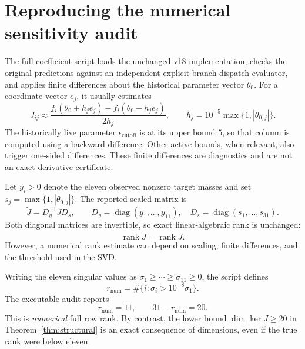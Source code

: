 \documentclass[11pt]{article}
\newcommand{\rank}{\operatorname{rank}}
\newcommand{\Null}{\operatorname{ker}}
\newcommand{\diag}{\operatorname{diag}}
\begin{document}
\section{Reproducing the numerical sensitivity audit}

The full-coefficient script loads the unchanged v18 implementation,
checks the original predictions against an independent explicit
branch-dispatch evaluator, and applies finite differences about the
historical parameter vector \(\theta_0\).
For a coordinate vector \(e_j\), it usually estimates
\begin{equation}
  J_{ij}\approx
   \frac{f_i(\theta_0+h_je_j)-f_i(\theta_0-h_je_j)}{2h_j},
  \qquad
  h_j=10^{-5}\max\{1,|\theta_{0,j}|\}.
  \label{eq:central}
\end{equation}
The historically live parameter \(\epsilon_{\mathrm{cutoff}}\)
is at its upper bound \(5\), so that column is computed using a
backward difference. Other active bounds, when relevant, also trigger
one-sided differences. These finite differences are diagnostics and
are not an exact derivative certificate.

Let \(y_i>0\) denote the eleven observed nonzero target masses and set
\(s_j=\max\{1,|\theta_{0,j}|\}\). The reported scaled matrix is
\begin{equation}
  \widetilde J= D_y^{-1} J D_s,
  \qquad
  D_y=\diag(y_1,\ldots,y_{11}),\quad
  D_s=\diag(s_1,\ldots,s_{31}).
  \label{eq:scaled}
\end{equation}
Both diagonal matrices are invertible, so exact linear-algebraic rank
is unchanged:
\begin{equation}
   \rank\widetilde J=\rank J.
\end{equation}
However, a numerical rank estimate can depend on scaling, finite
differences, and the threshold used in the SVD.

Writing the eleven singular values as
\(\sigma_1\geq\cdots\geq\sigma_{11}\geq0\), the script defines
\begin{equation}
  r_{\mathrm{num}}
   =\#\{i:\sigma_i>10^{-8}\sigma_1\}.
  \label{eq:rankthreshold}
\end{equation}
The executable audit reports
\begin{equation}
   \boxed{r_{\mathrm{num}}=11},\qquad
   \boxed{31-r_{\mathrm{num}}=20}.
\end{equation}
This is \emph{numerical} full row rank. By contrast, the lower bound
\(\dim\Null J\geq20\) in Theorem~\ref{thm:structural} is an exact
consequence of dimensions, even if the true rank were below eleven.
\end{document}
